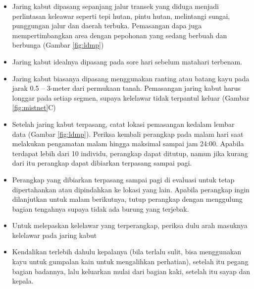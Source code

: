 \documentclass[
  oneside]{book}
\providecommand{\tightlist}{%
  \setlength{\itemsep}{0pt}\setlength{\parskip}{0pt}}
\begin{document}
\begin{itemize}
\tightlist
\item
  Jaring kabut dipasang sepanjang jalur transek yang diduga menjadi perlintasan keleawar seperti tepi hutan, pintu hutan, melintangi sungai, punggungan jalur dan daerah terbuka. Pemasangan dapa juga mempertimbangkan area dengan pepohonan yang sedang berbuah dan berbunga (Gambar \ref{fig:ldmp})
\item
  Jaring kabut idealnya dipasang pada sore hari sebelum matahari terbenam.
\item
  Jaring kabut biasanya dipasang menggunakan ranting atau batang kayu pada jarak 0.5 -- 3-meter dari permukaan tanah. Pemasangan jaring kabut harus longgar pada setiap segmen, supaya kelelawar tidak terpantul keluar (Gambar \ref{fig:mistnet}C)
\item
  Setelah jaring kabut terpasang, catat lokasi pemasangan kedalam lembar data (Gambar \ref{fig:ldmp}). Periksa kembali perangkap pada malam hari saat melakukan pengamatan malam hingga maksimal sampai jam 24:00. Apabila terdapat lebih dari 10 individu, perangkap dapat ditutup, namun jika kurang dari itu perangkap dapat dibiarkan terpasang sampai pagi.
\item
  Perangkap yang dibiarkan terpasang sampai pagi di evaluasi untuk tetap dipertahankan atau dipindahkan ke lokasi yang lain. Apabila perangkap ingin dilanjutkan untuk malam berikutnya, tutup perangkap dengan menggulung bagian tengahnya supaya tidak ada burung yang terjebak.
\item
  Untuk melepaskan kelelawar yang terperangkap, periksa dulu arah masuknya kelelawar pada jaring kabut
\item
  Kendalikan terlebih dahulu kepalanya (bila terlalu sulit, bisa menggunakan kayu untuk gumpalan kain untuk mengalihkan perhatian), setelah itu pegang bagian badannya, lalu keluarkan mulai dari bagian kaki, setelah itu sayap dan kepala.
\end{itemize}
\end{document}
